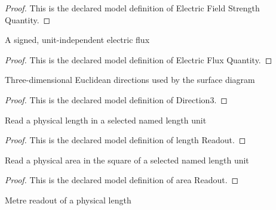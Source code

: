 \begin{proof}
  This is the declared model definition of Electric Field Strength Quantity.
\end{proof}
\begin{definition}
  \label{def:physics:phyx-mini-0844:phyxminiproblems-problemphyxmini0844-electricfluxquantity}
  A signed, unit-independent electric flux
\end{definition}
\begin{proof}
  This is the declared model definition of Electric Flux Quantity.
\end{proof}
\begin{definition}[Direction3]
  \label{def:physics:phyx-mini-0844:phyxminiproblems-problemphyxmini0844-direction3}
  Three-dimensional Euclidean directions used by the surface diagram
\end{definition}
\begin{proof}
  This is the declared model definition of Direction3.
\end{proof}
\begin{definition}
  \label{def:physics:phyx-mini-0844:phyxminiproblems-problemphyxmini0844-lengthreadout}
  Read a physical length in a selected named length unit
\end{definition}
\begin{proof}
  This is the declared model definition of length Readout.
\end{proof}
\begin{definition}
  \label{def:physics:phyx-mini-0844:phyxminiproblems-problemphyxmini0844-areareadout}
  Read a physical area in the square of a selected named length unit
\end{definition}
\begin{proof}
  This is the declared model definition of area Readout.
\end{proof}
\begin{definition}
  \label{def:physics:phyx-mini-0844:phyxminiproblems-problemphyxmini0844-lengthinmeters}
  Metre readout of a physical length
\end{definition}
